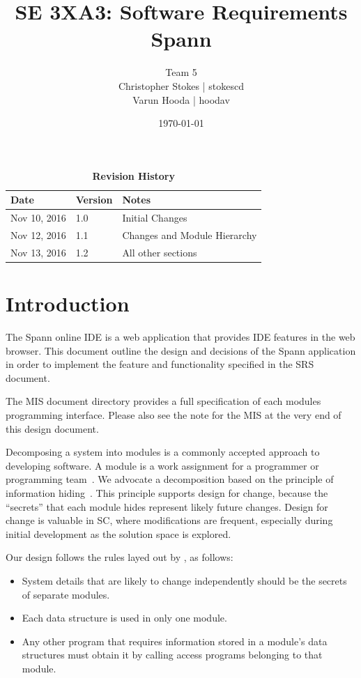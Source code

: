 \documentclass[12pt, titlepage]{article}
\title{SE 3XA3: Software Requirements\\Spann}
\author{Team 5
		\\ Christopher Stokes | stokescd
		\\ Varun Hooda | hoodav
}
\date{\today}
\begin{document}
\maketitle

\tableofcontents
\listoftables
\listoffigures

\begin{table}[bp]
\caption{\bf Revision History}
\begin{tabularx}{\textwidth}{p{3cm}p{2cm}X}
\toprule {\bf Date} & {\bf Version} & {\bf Notes}\\
\midrule
  Nov 10, 2016 & 1.0 & Initial Changes\\
  Nov 12, 2016 & 1.1 & Changes and Module Hierarchy\\
  Nov 13, 2016 & 1.2 & All other sections\\
\bottomrule
\end{tabularx}
\end{table}

\newpage


\section{Introduction}

The Spann online IDE is a web application that provides IDE features in the web
browser. This document outline the design and decisions of the Spann
application in order to implement the feature and functionality specified in the SRS document.

The MIS document directory provides a full specification of each modules
programming interface. Please also see the note for the MIS at the very end of
this design document.

Decomposing a system into modules is a commonly accepted approach to developing
software.  A module is a work assignment for a programmer or programming
team~\citep{ParnasEtAl1984}.  We advocate a decomposition
based on the principle of information hiding~\citep{Parnas1972a}.  This
principle supports design for change, because the ``secrets'' that each module
hides represent likely future changes.  Design for change is valuable in SC,
where modifications are frequent, especially during initial development as the
solution space is explored.

Our design follows the rules layed out by \citet{ParnasEtAl1984}, as follows:
\begin{itemize}
\item System details that are likely to change independently should be the
  secrets of separate modules.
\item Each data structure is used in only one module.
\item Any other program that requires information stored in a module's data
  structures must obtain it by calling access programs belonging to that module.
\end{itemize}
\end{document}
